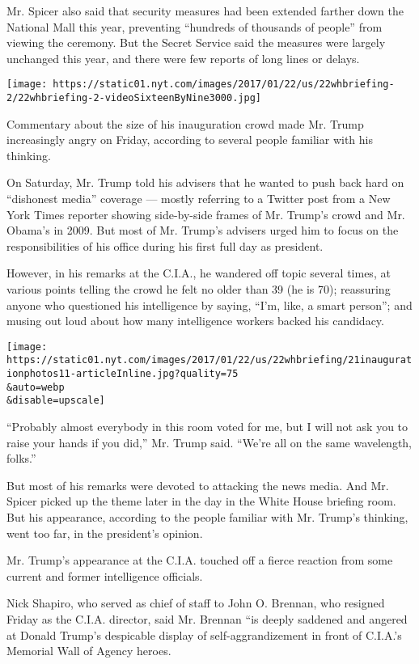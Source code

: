 Mr. Spicer also said that security measures had been extended farther
down the National Mall this year, preventing ``hundreds of thousands of
people'' from viewing the ceremony. But the Secret Service said the
measures were largely unchanged this year, and there were few reports of
long lines or delays.

\texttt{[image: https://static01.nyt.com/images/2017/01/22/us/22whbriefing-2/22whbriefing-2-videoSixteenByNine3000.jpg]}

Commentary about the size of his inauguration crowd made Mr. Trump
increasingly angry on Friday, according to several people familiar with
his thinking.

On Saturday, Mr. Trump told his advisers that he wanted to push back
hard on ``dishonest media'' coverage --- mostly referring to a Twitter
post from a New York Times reporter showing side-by-side frames of Mr.
Trump's crowd and Mr. Obama's in 2009. But most of Mr. Trump's advisers
urged him to focus on the responsibilities of his office during his
first full day as president.

However, in his remarks at the C.I.A., he wandered off topic several
times, at various points telling the crowd he felt no older than 39 (he
is 70); reassuring anyone who questioned his intelligence by saying,
``I'm, like, a smart person''; and musing out loud about how many
intelligence workers backed his candidacy.

\texttt{[image: https://static01.nyt.com/images/2017/01/22/us/22whbriefing/21inaugurationphotos11-articleInline.jpg?quality=75\\\&auto=webp\\\&disable=upscale]}

``Probably almost everybody in this room voted for me, but I will not
ask you to raise your hands if you did,'' Mr. Trump said. ``We're all on
the same wavelength, folks.''

But most of his remarks were devoted to attacking the news media. And
Mr. Spicer picked up the theme later in the day in the White House
briefing room. But his appearance, according to the people familiar with
Mr. Trump's thinking, went too far, in the president's opinion.

Mr. Trump's appearance at the C.I.A. touched off a fierce reaction from
some current and former intelligence officials.

Nick Shapiro, who served as chief of staff to John O. Brennan, who
resigned Friday as the C.I.A. director, said Mr. Brennan ``is deeply
saddened and angered at Donald Trump's despicable display of
self-aggrandizement in front of C.I.A.'s Memorial Wall of Agency heroes.

